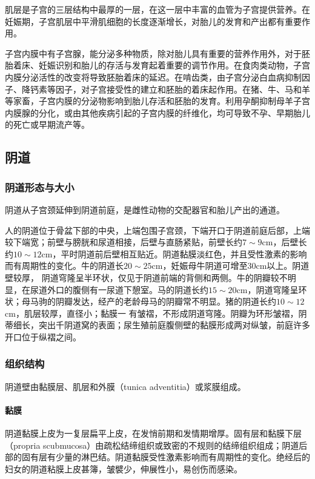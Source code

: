 肌层是子宫的三层结构中最厚的一层，在这一层中丰富的血管为子宫提供营养。在妊娠期，子宫肌层中平滑肌细胞的长度逐渐增长，对胎儿的发育和产出都有重要作用。

子宫内膜中有子宫腺，能分泌多种物质，除对胎儿具有重要的营养作用外，对于胚胎着床、妊娠识别和胎儿的存活与发育起着重要的调节作用。在食肉类动物，子宫内膜分泌活性的改变将导致胚胎着床的延迟。在啃齿类，由子宫分泌白血病抑制因子、降钙素等因子，对子宫接受性的建立和胚胎的着床起作用。在猪、牛、马和羊等家畜，子宫内膜的分泌物影响到胎儿存活和胚胎的发育。利用孕酮抑制母羊子宫内膜腺的分化，或由其他疾病引起的子宫内膜的纤维化，均可导致不孕、早期胎儿的死亡或早期流产等。


\subsection{阴道}

\subsubsection{阴道形态与大小}

阴道从子宫颈延伸到阴道前庭，是雌性动物的交配器官和胎儿产出的通道。

人的阴道位于骨盆下部的中央，上端包围子宫颈，下端开口于阴道前庭后部，上端较下端宽；前壁与膀胱和尿道相接，后壁与直肠紧贴，前壁长约$ 7\sim 9 $cm，后壁长约$ 10\sim 12 $cm，平时阴道前后壁相互贴近。阴道黏膜淡红色，并且受性激素的影响而有周期性的变化。牛的阴道长$ 20\sim 25 $cm，妊娠母牛阴道可增至30cm以上。阴道壁较厚， 阴道穹隆呈半环状，仅见于阴道前端的背侧和两侧。牛的阴瓣较不明显，在尿道外口的腹侧有一尿道下憩室。马的阴道长约$ 15\sim20 $cm，阴道穹隆呈环状；母马驹的阴瓣发达，经产的老龄母马的阴瓣常不明显。猪的阴道长约$ 10 \sim 12 $cm，肌层较厚，直径小；黏膜一
有皱褶，不形成阴道穹隆。阴瓣为环形皱褶，阴蒂细长，突出千阴道窝的表面；尿生殖前庭腹侧壁的黏膜形成两对纵皱，前庭许多开口位于纵褶之间。

\subsubsection{组织结构}

阴道壁由黏膜层、肌层和外膜（tunica adventitia）或浆膜组成。

\paragraph{黏膜}

阴道黏膜上皮为一复层扁平上皮，在发悄前期和发情期增厚。固有层和黏膜下层（propria scubmucosa）由疏松结缔组织或致密的不规则的结缔组织组成；阴道后部的固有层有少量的淋巴结。阴道黏膜受性激素影响而有周期性的变化。绝经后的妇女的阴道粘膜上皮甚簿，皱襞少，伸展性小，易创伤而感染。


